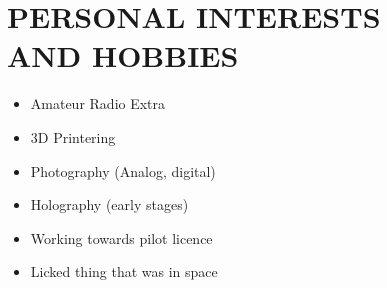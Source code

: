 \documentclass[line,mmmargin]{res}
\begin{document}
\begin{resume}
\begin{multicols}{2}
\begin{itemize}
			\end{itemize}
		\end{multicols}

\section{PERSONAL INTERESTS \\ AND HOBBIES}             
				\begin{multicols}{2}
					\begin{itemize}
						\itemsep -2pt
	\item[]Amateur Radio Extra
	\item[]3D Printering
	\item[]Photography (Analog, digital)
	\item[]Holography (early stages)
	\item[]Working towards pilot licence
	\item[]Licked thing that was in space

	\end{itemize}
	\end{multicols}


\end{resume}
\end{document}

